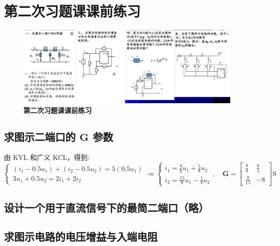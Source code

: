 \documentclass[UTF8]{report}
\theoremstyle{MyLineTheoremStyle} %
\theoremstyle{MyBlockTheoremStyle} %
\theoremstyle{MySubsubsectionStyle} %
\begin{document}
\chapter*{第二次习题课课前练习}

\begin{figure}[H]\centering
\includegraphics[width=0.95\columnwidth]{assets/4/16b6858d371dc967c7673595957d383b_720.jpg}
\caption{\bfseries 第二次习题课课前练习}\label{第二次习题课课前练习}
\end{figure}

\section{求图示二端口的 $\boldsymbol{G}$ 参数}\thispagestyle{fancy}

由 KVL 和广义 KCL，得到: 
\begin{equation}
\begin{cases}
    (i_1 - 0.5u_1) + (i_2 - 0.5u_2) = 5(0.5u_1) \\ 
    3u_1 + 0.5u_2 = 2i_1 + 2i_2
\end{cases}
\Longrightarrow 
\begin{cases}
    i_1 = \frac{9}{8}u_1 + \frac{5}{8}u_2 \\ 
    i_2 = \frac{15}{8}u_1 - \frac{1}{8}u_2
\end{cases}
,\quad \boldsymbol{G} = 
\begin{bmatrix}
    \frac{8}{9} & \frac{8}{5} \\ 
    \frac{8}{15} & - 8
\end{bmatrix}
\mathrm{S}
\end{equation}

\section{设计一个用于直流信号下的最简二端口（略）}

\section{求图示电路的电压增益与入端电阻}
\end{document}
